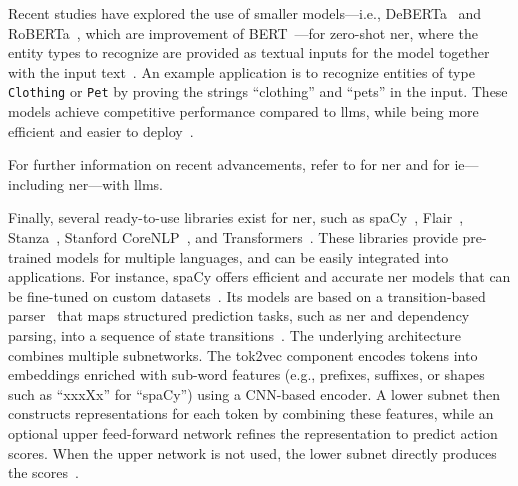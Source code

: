 Recent studies have explored the use of smaller models---i.e., DeBERTa~\cite{HeGChen2023} and RoBERTa~\cite{liu2020roberta}, which are improvement of BERT~\cite{devlin-etal-2019-bert}---for zero-shot \ac{ner}, where the entity types to recognize are provided as textual inputs for the model together with the input text~\cite{zaratiana-etal-2024-gliner,bogdanov-etal-2024-nuner}. An example application is to recognize entities of type \texttt{Clothing} or \texttt{Pet} by proving the strings ``clothing'' and ``pets'' in the input. These models achieve competitive performance compared to \acp{llm}, while being more efficient and easier to deploy~\cite{zaratiana-etal-2024-gliner,bogdanov-etal-2024-nuner}.


For further information on recent advancements, refer to \textcite{keraghel2024recentadvancesnamedentity} for \ac{ner} and \textcite{xu2024llm_for_ie} for \ac{ie}---including \ac{ner}---with \acp{llm}.


Finally, several ready-to-use libraries exist for \ac{ner}, such as spaCy~\cite{honnibal2020spacy}, Flair~\cite{akbik2019flair}, Stanza~\cite{qi2020stanza}, Stanford CoreNLP~\cite{manning-EtAl:2014:P14-5}, and Transformers~\cite{wolf-etal-2020-transformers}. These libraries provide pre-trained models for multiple languages, and can be easily integrated into applications. For instance, spaCy offers efficient and accurate \ac{ner} models that can be fine-tuned on custom datasets~\cite{honnibal2020spacy}. Its models are based on a transition-based parser~\cite{AliEtAl2023UnintendedMemorization} that maps structured prediction tasks, such as \ac{ner} and dependency parsing, into a sequence of state transitions~\cite{lample-etal-2016-neural}. The underlying architecture combines multiple subnetworks. The tok2vec component encodes tokens into embeddings enriched with sub-word features (e.g., prefixes, suffixes, or shapes such as ``xxxXx'' for ``spaCy'') using a CNN-based encoder. A lower subnet then constructs representations for each token by combining these features, while an optional upper feed-forward network refines the representation to predict action scores. When the upper network is not used, the lower subnet directly produces the scores~\cite{AliEtAl2023UnintendedMemorization}.




